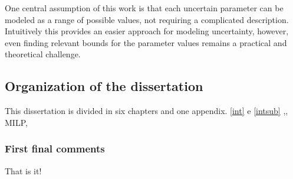 One central assumption of this work is that each uncertain parameter can be modeled as a range of possible values, not requiring a complicated description. Intuitively this provides an easier approach for modeling uncertainty, however, even finding relevant bounds for the parameter values remains a practical and theoretical challenge.
%
\subsection{Organization of the dissertation}\label{intsub}
%
This dissertation is divided in six chapters and one appendix.
\autoref{int} e \autoref{intsub}
,, \gls{MILP}, %
\subsubsection{First final comments}
That is it!
% 
% 
% 
% 
% 
